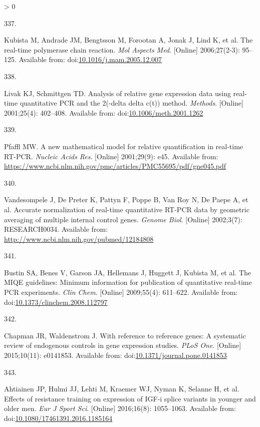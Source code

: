 \documentclass[twoside,10pt]{gihclass} %
\newlength{\cslhangindent}
\newlength{\csllabelwidth}
\newenvironment{CSLReferences}[3] %
 {%
  \setlength{\parindent}{0pt}
  \ifodd #1 \everypar{\setlength{\hangindent}{\cslhangindent}}\ignorespaces\fi
  \ifnum #2 > 0
  \setlength{\parskip}{#2\baselineskip}
  \fi
 }%
 {}
\newcommand{\CSLLeftMargin}[1]{\parbox[t]{\maxof{\widthof{#1}}{\csllabelwidth}}{#1}}
\newcommand{\CSLRightInline}[1]{\parbox[t]{\linewidth}{#1}}
\begin{document}
\begin{CSLReferences}{0}{0}
\leavevmode\hypertarget{ref-RN2099}{}%
\CSLLeftMargin{337. }
\CSLRightInline{Kubista M, Andrade JM, Bengtsson M, Forootan A, Jonak J, Lind K, et al. The real-time polymerase chain reaction. \emph{Mol Aspects Med}. {[}Online{]} 2006;27(2-3): 95--125. Available from: doi:\href{https://doi.org/10.1016/j.mam.2005.12.007}{10.1016/j.mam.2005.12.007}}

\leavevmode\hypertarget{ref-RN2100}{}%
\CSLLeftMargin{338. }
\CSLRightInline{Livak KJ, Schmittgen TD. Analysis of relative gene expression data using real-time quantitative PCR and the 2(-delta delta c(t)) method. \emph{Methods}. {[}Online{]} 2001;25(4): 402--408. Available from: doi:\href{https://doi.org/10.1006/meth.2001.1262}{10.1006/meth.2001.1262}}

\leavevmode\hypertarget{ref-RN2101}{}%
\CSLLeftMargin{339. }
\CSLRightInline{Pfaffl MW. A new mathematical model for relative quantification in real-time RT-PCR. \emph{Nucleic Acids Res}. {[}Online{]} 2001;29(9): e45. Available from: \url{https://www.ncbi.nlm.nih.gov/pmc/articles/PMC55695/pdf/gne045.pdf}}

\leavevmode\hypertarget{ref-RN991}{}%
\CSLLeftMargin{340. }
\CSLRightInline{Vandesompele J, De Preter K, Pattyn F, Poppe B, Van Roy N, De Paepe A, et al. Accurate normalization of real-time quantitative RT-PCR data by geometric averaging of multiple internal control genes. \emph{Genome Biol}. {[}Online{]} 2002;3(7): RESEARCH0034. Available from: \url{http://www.ncbi.nlm.nih.gov/pubmed/12184808}}

\leavevmode\hypertarget{ref-RN1983}{}%
\CSLLeftMargin{341. }
\CSLRightInline{Bustin SA, Benes V, Garson JA, Hellemans J, Huggett J, Kubista M, et al. The MIQE guidelines: Minimum information for publication of quantitative real-time PCR experiments. \emph{Clin Chem}. {[}Online{]} 2009;55(4): 611--622. Available from: doi:\href{https://doi.org/10.1373/clinchem.2008.112797}{10.1373/clinchem.2008.112797}}

\leavevmode\hypertarget{ref-RN1985}{}%
\CSLLeftMargin{342. }
\CSLRightInline{Chapman JR, Waldenstrom J. With reference to reference genes: A systematic review of endogenous controls in gene expression studies. \emph{PLoS One}. {[}Online{]} 2015;10(11): e0141853. Available from: doi:\href{https://doi.org/10.1371/journal.pone.0141853}{10.1371/journal.pone.0141853}}

\leavevmode\hypertarget{ref-RN2083}{}%
\CSLLeftMargin{343. }
\CSLRightInline{Ahtiainen JP, Hulmi JJ, Lehti M, Kraemer WJ, Nyman K, Selanne H, et al. Effects of resistance training on expression of IGF-i splice variants in younger and older men. \emph{Eur J Sport Sci}. {[}Online{]} 2016;16(8): 1055--1063. Available from: doi:\href{https://doi.org/10.1080/17461391.2016.1185164}{10.1080/17461391.2016.1185164}}


\end{CSLReferences}
\end{document}
